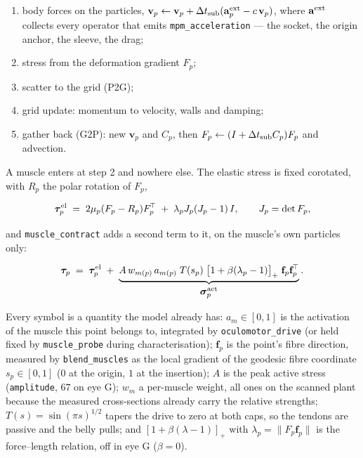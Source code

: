 \documentclass[10pt]{article}
\begin{document}
\begin{enumerate}\itemsep0pt
\item body forces on the particles, $\mathbf{v}_p \leftarrow \mathbf{v}_p + \Delta t_{\rm
sub}(\mathbf{a}^{\rm ext}_p - c\,\mathbf{v}_p)$, where $\mathbf{a}^{\rm ext}$ collects every
operator that emits \texttt{mpm\_acceleration} --- the socket, the origin anchor, the
sleeve, the drag;
\item stress from the deformation gradient $F_p$;
\item scatter to the grid (P2G);
\item grid update: momentum to velocity, walls and damping;
\item gather back (G2P): new $\mathbf{v}_p$ and $C_p$, then $F_p \leftarrow (I + \Delta
t_{\rm sub} C_p)F_p$ and advection.
\end{enumerate}

A muscle enters at step 2 and nowhere else. The elastic stress is fixed corotated, with
$R_p$ the polar rotation of $F_p$,

\begin{equation}
\boldsymbol\tau^{\rm el}_p \;=\; 2\mu_p (F_p - R_p)F_p^{\!\top} \;+\; \lambda_p J_p (J_p-1)\,I ,
\qquad J_p=\det F_p ,
\label{eq:corot}
\end{equation}

and \texttt{muscle\_contract} adds a second term to it, on the muscle's own particles only:

\begin{equation}
\boldsymbol\tau_p \;=\; \boldsymbol\tau^{\rm el}_p \;+\; \underbrace{A\,w_{m(p)}\,a_{m(p)}\;T(s_p)\;\big[1+\beta(\lambda_p-1)\big]_+\;\mathbf{f}_p\mathbf{f}_p^{\!\top}}_{\textstyle \boldsymbol\sigma^{\rm act}_p} .
\label{eq:active}
\end{equation}

Every symbol is a quantity the model already has: $a_{m}\in[0,1]$ is the activation of the
muscle this point belongs to, integrated by \texttt{oculomotor\_drive} (or held fixed by
\texttt{muscle\_probe} during characterisation); $\mathbf{f}_p$ is the point's fibre
direction, measured by \texttt{blend\_muscles} as the local gradient of the geodesic fibre
coordinate $s_p\in[0,1]$ ($0$ at the origin, $1$ at the insertion); $A$ is the peak active
stress (\texttt{amplitude}, $67$ on eye G); $w_m$ a per-muscle weight, all ones on the
scanned plant because the measured cross-sections already carry the relative strengths;
$T(s)=\sin(\pi s)^{1/2}$ tapers the drive to zero at both caps, so the tendons are passive
and the belly pulls; and $[1+\beta(\lambda-1)]_+$ with $\lambda_p=\|F_p\mathbf{f}_p\|$ is
the force--length relation, off in eye G ($\beta=0$).
\end{document}

